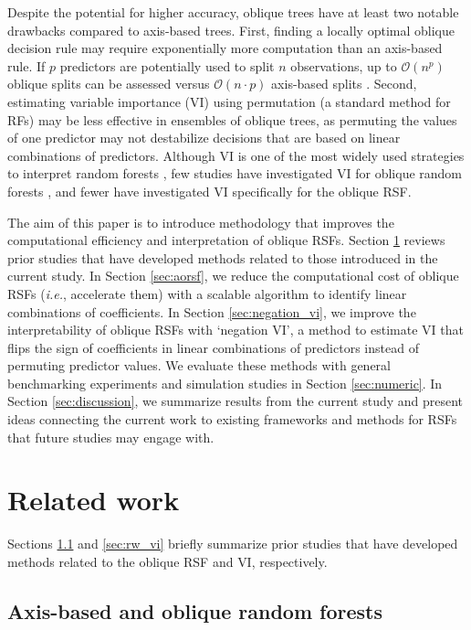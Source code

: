 \documentclass{article}\usepackage[]{graphicx}\usepackage[]{xcolor}
\newcommand{\ie}{\textit{i.e.}}
\newcommand{\secref}[1]{Section \ref{#1}}
\begin{document}
Despite the potential for higher accuracy, oblique trees have at least two notable drawbacks compared to axis-based trees. First, finding a locally optimal oblique decision rule may require exponentially more computation than an axis-based rule. If $p$ predictors are potentially used to split $n$ observations, up to $\mathcal{O}(n^p)$ oblique splits can be assessed versus $\mathcal{O}(n \cdot p)$ axis-based splits \citep{heath1993induction, murthy1994system}. Second, estimating variable importance (VI) using permutation (a standard method for RFs) may be less effective in ensembles of oblique trees, as permuting the values of one predictor may not destabilize decisions that are based on linear combinations of predictors. Although VI is one of the most widely used strategies to interpret random forests \citep{ishwaran2019standard}, few studies have investigated VI for oblique random forests \citep[see][Section~5]{menze2011oblique}, and fewer have investigated VI specifically for the oblique RSF.

The aim of this paper is to introduce methodology that improves the computational efficiency and interpretation of oblique RSFs. \secref{sec:background} reviews prior studies that have developed methods related to those introduced in the current study. In \secref{sec:aorsf}, we reduce the computational cost of oblique RSFs (\ie, accelerate them) with a scalable algorithm to identify linear combinations of coefficients. In \secref{sec:negation_vi}, we improve the interpretability of oblique RSFs with `negation VI', a method to estimate VI that flips the sign of coefficients in linear combinations of predictors instead of permuting predictor values. We evaluate these methods with general benchmarking experiments and simulation studies in \secref{sec:numeric}. In \secref{sec:discussion}, we summarize results from the current study and present ideas connecting the current work to existing frameworks and methods for RSFs that future studies may engage with.


\section{Related work} \label{sec:background}

Sections \ref{sec:rw_forests} and \ref{sec:rw_vi} briefly summarize prior studies that have developed methods related to the oblique RSF and VI, respectively.

\subsection{Axis-based and oblique random forests} \label{sec:rw_forests}
\end{document}
